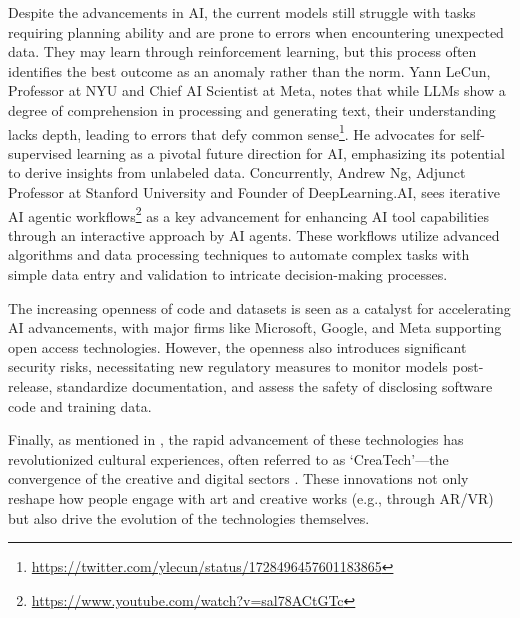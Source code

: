 \documentclass[11pt,a4paper]{article}
\begin{document}
Despite the advancements in AI, the current models still struggle with tasks requiring planning ability and are prone to errors when encountering unexpected data. They may learn through reinforcement learning, but this process often identifies the best outcome as an anomaly rather than the norm. Yann LeCun, Professor at NYU and Chief AI Scientist at Meta, notes that while LLMs show a degree of comprehension in processing and generating text, their understanding lacks depth, leading to errors that defy common sense\footnote{\url{https://twitter.com/ylecun/status/1728496457601183865}}. He advocates for self-supervised learning as a pivotal future direction for AI, emphasizing its potential to derive insights from unlabeled data. Concurrently, Andrew Ng, Adjunct Professor at Stanford University and Founder of DeepLearning.AI, sees iterative AI agentic workflows\footnote{\url{https://www.youtube.com/watch?v=sal78ACtGTc}} as a key advancement for enhancing AI tool capabilities through an interactive approach by AI agents. These workflows utilize advanced algorithms and data processing techniques to automate complex tasks with simple data entry and validation to intricate decision-making processes.

The increasing openness of code and datasets is seen as a catalyst for accelerating AI advancements, with major firms like Microsoft, Google, and Meta supporting open access technologies. However, the openness also introduces significant security risks, necessitating new regulatory measures to monitor models post-release, standardize documentation, and assess the safety of disclosing software code and training data.

Finally, as mentioned in \cite{Jeary2024}, the rapid advancement of these technologies has revolutionized cultural experiences, often referred to as `CreaTech'—the convergence of the creative and digital sectors \cite{CreativeIndustriesCouncil2021}. These innovations not only reshape how people engage with art and creative works (e.g., through AR/VR) but also drive the evolution of the technologies themselves.

\end{document}
